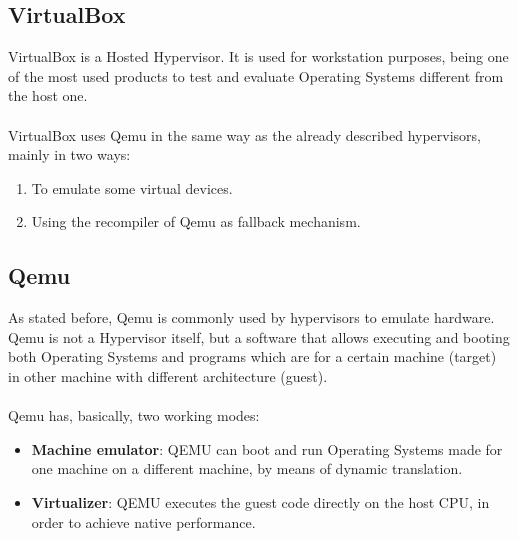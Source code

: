 \documentclass[11pt]{article}
\begin{document}
\subsection{VirtualBox}
VirtualBox is a Hosted Hypervisor. It is used for workstation purposes, being one of the most used products to test and evaluate Operating Systems different from the host one.\\
\\
VirtualBox uses Qemu in the same way as the already described hypervisors, mainly in two ways:
\begin{enumerate}
\item{To emulate some virtual devices}.
\item{Using the recompiler of Qemu as fallback mechanism}.
\end{enumerate}
\subsection{Qemu}
As stated before, Qemu is commonly used by hypervisors to emulate hardware. Qemu is not a Hypervisor itself, but a software that allows executing and booting both Operating Systems and programs which are for a certain machine (target) in other machine with different architecture (guest).\\
\\ 
Qemu has, basically, two working modes:
\begin{itemize}
\item{\textbf{Machine emulator}}: QEMU can boot and run Operating Systems made for one machine on a different machine, by means of dynamic translation.
\item{\textbf{Virtualizer}}: QEMU executes the guest code directly on the host CPU, in order to achieve native performance.
\end{itemize}
\end{document}
